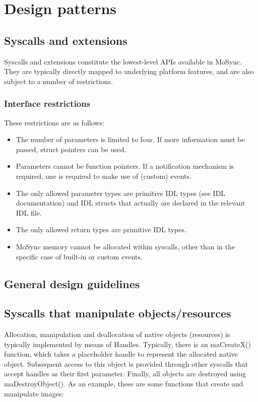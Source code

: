 \documentclass {article}
\begin{document}
\section{Design patterns}
\subsection{Syscalls and extensions}
Syscalls and extensions constitute the lowest-level APIs available in MoSync. They are typically directly mapped to underlying platform features, and are also subject to a number of restrictions. 


\subsubsection{Interface restrictions}
These restrictions are as follows:

\begin{itemize}
	\item The number of parameters is limited to four. If more information must be passed, struct pointers can be used.
	\item Parameters cannot be function pointers. If a notification mechanism is required, one is required to make use of (custom) events.
	\item The only allowed parameter types are primitive IDL types (see IDL documentation) and IDL structs that actually are declared in the relevant IDL file.
	\item The only allowed return types are primitive IDL types.
	\item MoSync memory cannot be allocated within syscalls, other than in the specific case of built-in or custom events.
\end{itemize}

\subsection{General design guidelines}

\subsection{Syscalls that manipulate objects/resources}
Allocation, manipulation and deallocation of native objects (resources) is typically implemented by means of Handles. Typically, there is an maCreateX() function, which takes a placeholder handle to represent the allocated native object. Subsequent access to this object is provided through other syscalls that accept handles as their first parameter. Finally, all objects are destroyed using maDestroyObject(). As an example, these are some functions that create and manipulate images:
\end{document}
